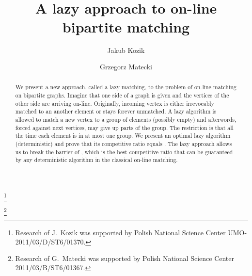 \documentclass[12pt]{amsart}
\theoremstyle{definition}
\begin{document}
\title{A lazy approach to on-line bipartite matching}

\author[J.\ Kozik]{Jakub Kozik} 
\thanks{Research of J.\ Kozik was supported by Polish National Science Center UMO-2011/03/D/ST6/01370.}

\author[G.\ Matecki]{Grzegorz Matecki}
\thanks{Research of G.\ Matecki was supported by Polish National Science Center 2011/03/B/ST6/01367.}
\address{
  Theoretical Computer Science\\
  Faculty of Mathematics and
  Computer Science\\Jagiellonian University in Krak\'{o}w\\
Poland}




\begin{abstract}
We present a new approach, called a lazy matching, to the problem of on-line matching on bipartite graphs.
Imagine that one side of a graph is given and the vertices of the other side are arriving on-line.
Originally, incoming vertex is either irrevocably matched to an another element or stays forever unmatched.
A lazy algorithm is allowed to match a new vertex to a group of elements (possibly empty) and afterwords, forced against next vertices, may give up parts of the group. 
The restriction is that all the time each element is in at most one group.
We present an optimal lazy algorithm (deterministic) and prove that its competitive ratio equals .
The lazy approach allows us to break the barrier of , which is the best  competitive ratio that can be guaranteed by any deterministic algorithm in the classical on-line matching.
\end{abstract}

\maketitle
\end{document}
